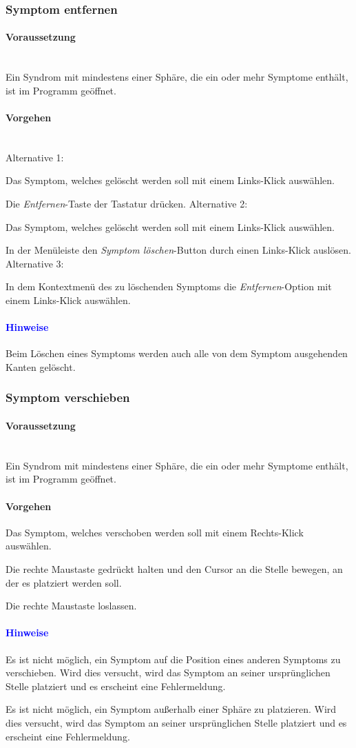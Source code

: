 \documentclass[enabledeprecatedfontcommands,fontsize=11pt,paper=a4,twoside]{scrartcl}
\newcounter{one}
\newcounter{two}[one]
\newcommand*{\hint}{\paragraph{\textcolor{blue}{Hinweise}}}
\newcommand*{\condition}{\paragraph{Voraussetzung}$\;$ \vspace{0.2cm}\\}
\newcommand*{\actions}{\paragraph{Vorgehen} $\;$\vspace{0.2cm}\\}
\newcommand*{\action}{\paragraph{Vorgehen}}
\newcommand*{\aOne}{\textcolor{bbe}{Alternative 1:}}
\newcommand*{\aTwo}{\textcolor{bbe}{Alternative 2:}}
\newcommand*{\aThree}{\textcolor{bbe}{Alternative 3:}}
\let\tempone\itemize
\let\temptwo\enditemize
\renewenvironment{itemize}{\tempone\addtolength{\itemsep}{-10.0pt}}{\temptwo}
\let\origenumerate\enumerate
\let\origendenumerate\endenumerate
\renewenvironment{enumerate}{\origenumerate \addtolength{\itemsep}{-10.0pt}}{\origendenumerate}
\begin{document}
\subsubsection{Symptom entfernen}
		\condition 	
		Ein Syndrom mit mindestens einer Sphäre, die ein oder mehr Symptome enthält, ist im Programm geöffnet. 
		\actions
		\aOne
		\begin{enumerate}
			\item Das Symptom, welches gelöscht werden soll mit einem Links-Klick auswählen. 
			\item Die \textit{Entfernen}-Taste der Tastatur drücken.
		\end{enumerate}
		\aTwo
		\begin{enumerate}
			\item Das Symptom, welches gelöscht werden soll mit einem Links-Klick auswählen. 
			\item In der Menüleiste den \textit{Symptom löschen}-Button durch einen Links-Klick auslösen.
		\end{enumerate}
		\aThree
			\begin{enumerate} 
				\item In dem Kontextmenü des zu löschenden Symptoms die \textit{Entfernen}-Option mit einem Links-Klick auswählen.
			\end{enumerate}
		\hint
		\begin{itemize}
			\item Beim Löschen eines Symptoms werden auch alle von dem Symptom ausgehenden Kanten gelöscht. \\
		\end{itemize}
		
\subsubsection{Symptom verschieben}
		\condition 	
		Ein Syndrom mit mindestens einer Sphäre, die ein oder mehr Symptome enthält, ist im Programm geöffnet. 
		\action
		\begin{enumerate}
			\item Das Symptom, welches verschoben werden soll mit einem Rechts-Klick auswählen. 
			\item Die rechte Maustaste gedrückt halten und den Cursor an die Stelle bewegen, an der es platziert werden soll.
			\item Die rechte Maustaste loslassen. 
		\end{enumerate}
		\hint
		\begin{itemize}
			\item Es ist nicht möglich, ein Symptom auf die Position eines anderen Symptoms zu verschieben. Wird dies versucht, wird das Symptom an seiner ursprünglichen Stelle platziert und es erscheint eine Fehlermeldung.
			\item Es ist nicht möglich, ein Symptom außerhalb einer Sphäre zu platzieren. Wird dies versucht, wird das Symptom an seiner ursprünglichen Stelle platziert und es erscheint eine Fehlermeldung.
		\end{itemize}
		
\end{document}

